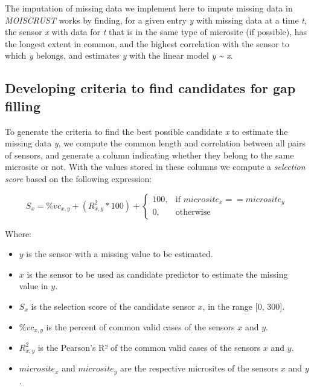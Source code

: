 \documentclass[]{article}
\providecommand{\tightlist}{%
  \setlength{\itemsep}{0pt}\setlength{\parskip}{0pt}}
\begin{document}
The imputation of missing data we implement here to impute missing data
in \emph{MOISCRUST} works by finding, for a given entry \emph{y} with
missing data at a time \emph{t}, the sensor \emph{x} with data for
\emph{t} that is in the same type of microsite (if possible), has the
longest extent in common, and the highest correlation with the sensor to
which \emph{y} belongs, and estimates \emph{y} with the linear model
\emph{y \textasciitilde{} x}.

\hypertarget{developing-criteria-to-find-candidates-for-gap-filling}{%
\subsection{Developing criteria to find candidates for gap
filling}\label{developing-criteria-to-find-candidates-for-gap-filling}}

To generate the criteria to find the best possible candidate \emph{x} to
estimate the missing data \emph{y}, we compute the common length and
correlation between all pairs of sensors, and generate a column
indicating whether they belong to the same microsite or not. With the
values stored in these columns we compute a \emph{selection score} based
on the following expression:

\[S_{x} = \%vc_{x, y} + (R_{x, y}^2 * 100) + \left\{
\begin{array}{ll}
      100, & \mbox{if $microsite_{x} == microsite_{y}$}\\
      0, & \mbox{otherwise}
\end{array}
\right. \]

Where:

\begin{itemize}
\tightlist
\item
  \(y\) is the sensor with a missing value to be estimated.
\item
  \(x\) is the sensor to be used as candidate predictor to estimate the
  missing value in \(y\).
\item
  \(S_{x}\) is the selection score of the candidate sensor \(x\), in the
  range {[}0, 300{]}.
\item
  \(\%vc_{x, y}\) is the percent of common valid cases of the sensors
  \(x\) and \(y\).
\item
  \(R_{x, y}^2\) is the Pearson's R² of the common valid cases of the
  sensors \(x\) and \(y\).
\item
  \(microsite_{x}\) and \(microsite_{y}\) are the respective microsites
  of the sensors \(x\) and \(y\).
\end{itemize}
\end{document}

